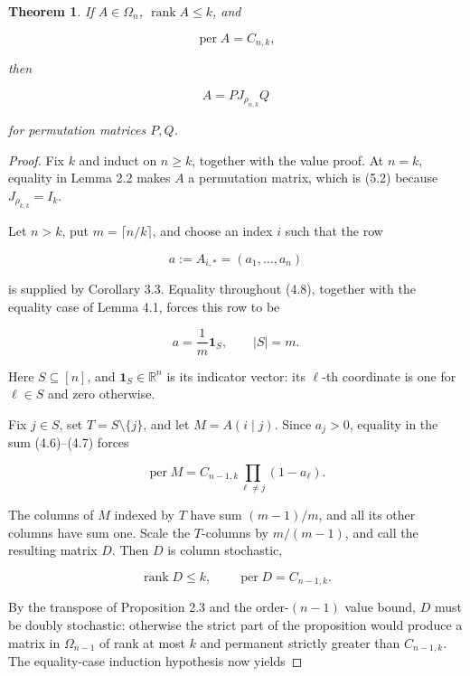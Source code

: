 \documentclass[11pt]{article}
\newtheorem{theorem}{Theorem}[section]
\theoremstyle{remark}
\begin{document}
\begin{theorem}
If
\(A\in\Omega_n\), \(\operatorname{rank}A\leq k\), and

\[
 \operatorname{per}A=C_{n,k},                              \tag{5.1}
\]

then

\[
 A=PJ_{\rho_{n,k}}Q                                        \tag{5.2}
\]

for permutation matrices \(P,Q\).
\end{theorem}

\begin{proof}
Fix \(k\) and induct on \(n\geq k\), together with the value
proof. At \(n=k\), equality in Lemma 2.2 makes \(A\) a permutation matrix,
which is (5.2) because \(J_{\rho_{k,k}}=I_k\).

Let \(n>k\), put \(m=\lceil n/k\rceil\), and choose an index \(i\) such that
the row

\[
 a:=A_{i,*}=(a_1,\ldots,a_n)
\]

is supplied by Corollary 3.3. Equality throughout (4.8), together with the
equality case of Lemma 4.1, forces this row to be

\nopagebreak[4]
\[
 a=\frac1m\mathbf1_S,
 \qquad |S|=m.                                              \tag{5.3}
\]

Here \(S\subseteq[n]\), and \(\mathbf1_S\in\mathbb R^n\) is its indicator
vector: its \(\ell\)-th coordinate is one for \(\ell\in S\) and zero
otherwise.

Fix \(j\in S\), set \(T=S\setminus\{j\}\), and let
\(M=A(i\mid j)\). Since \(a_j>0\), equality in the sum (4.6)--(4.7) forces

\[
 \operatorname{per}M
 =C_{n-1,k}\prod_{\ell\ne j}(1-a_\ell).                   \tag{5.4}
\]

The columns of \(M\) indexed by \(T\) have sum \((m-1)/m\), and all its
other columns have sum one. Scale the \(T\)-columns by \(m/(m-1)\), and call
the resulting matrix \(D\). Then \(D\) is column stochastic,

\[
 \operatorname{rank}D\leq k,
 \qquad
 \operatorname{per}D=C_{n-1,k}.                            \tag{5.5}
\]

By the transpose of Proposition 2.3 and the order-\((n-1)\) value bound, \(D\)
must be doubly stochastic: otherwise the strict part of the proposition would
produce a matrix in \(\Omega_{n-1}\) of rank at most \(k\) and permanent
strictly greater than \(C_{n-1,k}\). The equality-case induction hypothesis
now yields


\end{proof}
\end{document}
